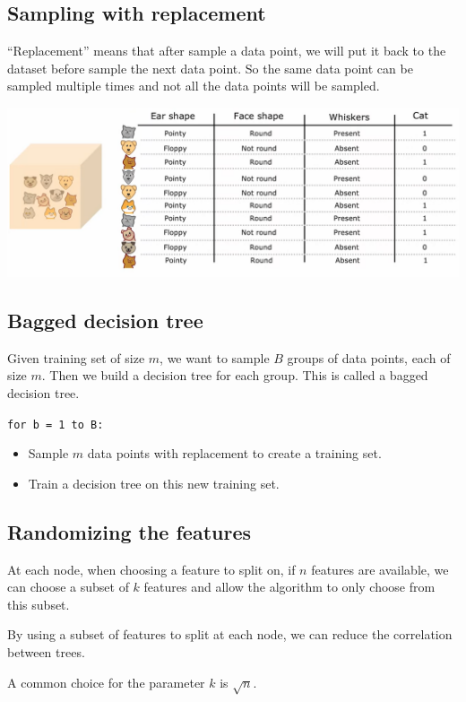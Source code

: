\subsection*{Sampling with replacement}
``Replacement'' means that after sample a data point, we will put it back to the dataset before sample the next
data point. So the same data point can be sampled multiple times and not all the data points will be sampled.
\par
\includegraphics*[width=\textwidth]{images/11.15}
\subsection*{Bagged decision tree}
Given training set of size $m$, we want to sample $B$ groups of data points, each of size $m$.
Then we build a decision tree for each group. This is called a bagged decision tree.\par

\texttt{for b = 1 to B:}
\begin{itemize}
    \item Sample $m$ data points with replacement to create a training set.
    \item Train a decision tree on this new training set.
\end{itemize}
\par
\subsection*{Randomizing the features}
At each node, when choosing a feature to split on, if $n$ features are available, we can choose a subset of $k$ features and 
allow the algorithm to only choose from this subset.\par
By using a subset of features to split at each node, we can reduce the correlation between trees.
\begin{notebox}
    A common choice for the parameter $k$ is $\sqrt{n}$.
\end{notebox}
